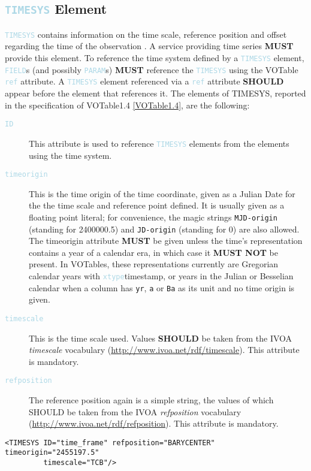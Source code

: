 \documentclass[11pt,a4paper]{ivoa}
\newcommand\elem[1]{\textcolor{LightBlue}{{\tt#1}}}
\begin{document}
\subsection{\elem{TIMESYS} Element}
\elem{TIMESYS} contains information on the time scale, reference position and offset regarding the time of the observation \cite{VOTable1.4, TIMESYS}. A service providing time series \textbf{MUST} provide this element. To reference the time system defined by a \elem{TIMESYS} element, \elem{FIELD}s (and possibly \elem{PARAM}s) \textbf{MUST} reference the \elem{TIMESYS} using the VOTable \elem{ref} attribute. A \elem{TIMESYS} element referenced via a \elem{ref} attribute \textbf{SHOULD} appear before the element that references it.  The elements of TIMESYS, reported in the specification of VOTable1.4 \ref{VOTable1.4}, are the following:
\begin{description}
   \item[\elem{ID}] This attribute is used to reference \elem{TIMESYS} elements from the elements using the time system.
   \item[\elem{timeorigin}] This is the time origin of the time coordinate, given as a Julian Date for the the time scale and reference point
defined.  It is usually given as a floating point literal; for convenience, the magic strings \verb|MJD-origin| (standing
for 2400000.5) and \verb|JD-origin| (standing for 0) are also allowed. The timeorigin attribute \textbf{MUST} be given unless the time's representation contains a year of a calendar era, in which case it \textbf{MUST NOT} be present. In VOTables, these representations currently are Gregorian calendar years with \elem{xtype}{timestamp}, or years in the Julian or Besselian calendar when a column has \verb|yr|, \verb|a| or \verb|Ba| as its unit and no time origin is given. 
   \item[\elem{timescale}] This is the time scale used. Values \textbf{SHOULD} be taken from the IVOA \emph{timescale} vocabulary (\url{http://www.ivoa.net/rdf/timescale}). This attribute is mandatory.
   \item[\elem{refposition}] The reference position again is a simple string, the values of which SHOULD be taken from the IVOA \emph{refposition} vocabulary (\url{http://www.ivoa.net/rdf/refposition}). This attribute is mandatory.
\end{description}

\noindent
\begingroup\footnotesize
\begin{tcolorbox}
\begin{verbatim}
<TIMESYS ID="time_frame" refposition="BARYCENTER" timeorigin="2455197.5"
         timescale="TCB"/>
\end{verbatim}
\end{tcolorbox}
\endgroup
\end{document}
